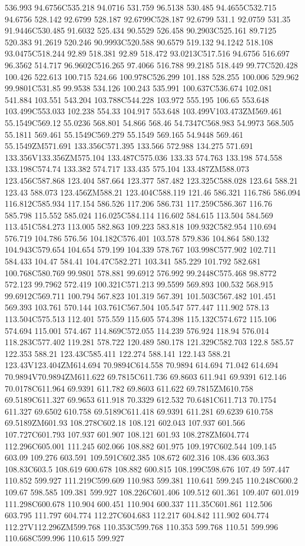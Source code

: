 536.993 94.6756C535.218 94.0716 531.759 96.5138 530.485 94.4655C532.715 94.6756 528.142 92.6799 528.187 92.6799C528.187 92.6799 531.1 92.0759 531.35 91.9446C530.485 91.6032 525.434 90.5529 526.458 90.2903C525.161 89.7125 520.383 91.2619 520.246 90.9993C520.588 90.6579 519.132 94.1242 518.108 93.0475C518.244 92.89 518.381 92.89 518.472 93.0213C517.516 94.6756 516.697 96.3562 514.717 96.9602C516.265 97.4066 516.788 99.2185 518.449 99.77C520.428 100.426 522.613 100.715 524.66 100.978C526.299 101.188 528.255 100.006 529.962 99.9801C531.85 99.9538 534.126 100.243 535.991 100.637C536.674 102.081 541.884 103.551 543.204 103.788C544.228 103.972 555.195 106.65 553.648 103.499C553.033 102.238 554.33 104.917 553.648 103.499V103.473ZM569.461 55.1549C569.12 55.0236 568.801 54.866 568.46 54.7347C568.983 54.9973 568.505 55.1811 569.461 55.1549C569.279 55.1549 569.165 54.9448 569.461 55.1549ZM571.691 133.356C571.395 133.566 572.988 134.275 571.691 133.356V133.356ZM575.104 133.487C575.036 133.33 574.763 133.198 574.558 133.198C574.74 133.382 574.717 133.435 575.104 133.487ZM588.073 123.456C587.868 123.404 587.664 123.377 587.482 123.325C588.028 123.64 588.21 123.43 588.073 123.456ZM588.21 123.404C588.119 121.46 586.321 116.786 586.094 116.812C585.934 117.154 586.526 117.206 586.731 117.259C586.367 116.76 585.798 115.552 585.024 116.025C584.114 116.602 584.615 113.504 584.569 113.451C584.273 113.005 582.863 109.223 583.818 109.932C582.954 110.694 576.719 104.786 576.56 104.182C576.401 103.578 579.836 104.864 580.132 104.943C579.654 104.654 579.199 104.339 578.767 103.998C577.902 102.711 584.433 104.47 584.41 104.47C582.271 103.341 585.229 101.792 582.681 100.768C580.769 99.9801 578.881 99.6912 576.992 99.2448C575.468 98.8772 572.123 99.7962 572.419 100.321C571.213 99.5599 569.893 100.532 568.915 99.6912C569.711 100.794 567.823 101.319 567.391 101.503C567.482 101.451 569.393 103.761 570.144 103.761C567.504 105.547 577.447 111.902 578.13 113.504C575.513 112.401 575.559 115.605 574.398 115.132C574.672 115.106 574.694 115.001 574.467 114.869C572.055 114.239 576.924 118.94 576.014 118.283C577.402 119.281 578.722 120.489 580.178 121.329C582.703 122.8 585.57 122.353 588.21 123.43C585.411 122.274 588.141 122.143 588.21 123.43V123.404ZM614.694 70.9894C614.558 70.9894 614.694 71.042 614.694 70.9894V70.9894ZM611.622 69.7815C611.736 69.8603 611.941 69.9391 612.146 70.0178C611.964 69.9391 611.782 69.8603 611.622 69.7815ZM610.758 69.5189C611.327 69.9653 611.918 70.3329 612.532 70.6481C611.713 70.1754 611.327 69.6502 610.758 69.5189C611.418 69.9391 611.281 69.6239 610.758 69.5189ZM601.93 108.278C602.18 108.121 602.043 107.937 601.566 107.727C601.793 107.937 601.907 108.121 601.93 108.278ZM604.774 112.296C605.001 111.245 602.066 108.882 601.975 109.197C602.544 109.145 603.09 109.276 603.591 109.591C602.385 108.672 602.316 108.436 603.363 108.83C603.5 108.619 600.678 108.882 600.815 108.199C598.676 107.49 597.447 110.852 599.927 111.219C599.609 110.983 599.381 110.641 599.245 110.248C600.2 109.67 598.585 109.381 599.927 108.226C601.406 109.512 601.361 109.407 601.019 111.298C600.678 110.904 600.451 110.904 600.337 111.35C601.861 112.506 603.795 111.797 604.774 112.27C604.683 112.217 604.842 111.902 604.774 112.27V112.296ZM599.768 110.353C599.768 110.353 599.768 110.51 599.996 110.668C599.996 110.615 599.927 